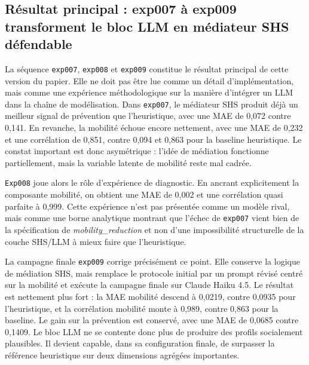 \documentclass[ROIA,Unicode]{cedram}
\begin{document}
\subsection{Résultat principal : exp007 à exp009 transforment le bloc LLM en médiateur SHS défendable}
La séquence \texttt{exp007}, \texttt{exp008} et \texttt{exp009} constitue le résultat principal de cette version du papier. Elle ne doit pas être lue comme un détail d'implémentation, mais comme une expérience méthodologique sur la manière d'intégrer un LLM dans la chaîne de modélisation. Dans \texttt{exp007}, le médiateur SHS produit déjà un meilleur signal de prévention que l'heuristique, avec une MAE de 0,072 contre 0,141. En revanche, la mobilité échoue encore nettement, avec une MAE de 0,232 et une corrélation de 0,851, contre 0,094 et 0,863 pour la baseline heuristique. Le constat important est donc asymétrique : l'idée de médiation fonctionne partiellement, mais la variable latente de mobilité reste mal cadrée.

\texttt{Exp008} joue alors le rôle d'expérience de diagnostic. En ancrant explicitement la composante mobilité, on obtient une MAE de 0,002 et une corrélation quasi parfaite à 0,999. Cette expérience n'est pas présentée comme un modèle rival, mais comme une borne analytique montrant que l'échec de \texttt{exp007} vient bien de la spécification de \emph{mobility\_reduction} et non d'une impossibilité structurelle de la couche SHS/LLM à mieux faire que l'heuristique.

La campagne finale \texttt{exp009} corrige précisément ce point. Elle conserve la logique de médiation SHS, mais remplace le protocole initial par un prompt révisé centré sur la mobilité et exécute la campagne finale sur Claude Haiku 4.5. Le résultat est nettement plus fort : la MAE mobilité descend à 0,0219, contre 0,0935 pour l'heuristique, et la corrélation mobilité monte à 0,989, contre 0,863 pour la baseline. Le gain sur la prévention est conservé, avec une MAE de 0,0685 contre 0,1409. Le bloc LLM ne se contente donc plus de produire des profils socialement plausibles. Il devient capable, dans sa configuration finale, de surpasser la référence heuristique sur deux dimensions agrégées importantes.
\end{document}
